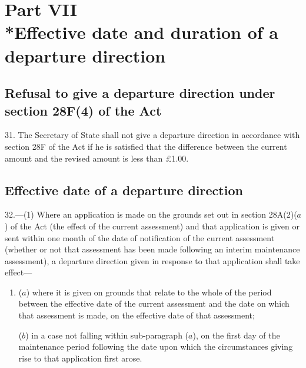\documentclass[12pt,a4paper]{article}
\begin{document}
\section[Part VII --- Effective date and duration of a departure direction]{Part VII\\*Effective date and duration of a departure direction}

\renewcommand\parthead{--- Part VII}

\subsection[31. Refusal to give a
departure direction under section 28F(4) of the Act]{Refusal to give a
departure direction under section 28F(4) of the Act}

31. The Secretary of State
shall not give a departure direction in accordance with section 28F of the Act
if he is satisfied that the difference between the current amount and the
revised amount is less than £1.00.

\subsection[32. Effective date of a departure direction]{Effective date of a departure direction}

32.—(1) Where an application is made on the grounds set out in section 28A(2)($a$) of the Act (the effect of the current assessment) and that application is given or sent within 
one month  %
of the date of notification of the current assessment (whether or not that assessment has been made following an interim maintenance assessment), a departure direction given in response to that application shall take effect—
\begin{enumerate}\item[]
($a$) where it is given on grounds that relate to the whole of the period between the effective date of the current assessment and the date on which that assessment is made, on the effective date of that assessment;

($b$) in a case not falling within sub-paragraph ($a$), on the first day of the maintenance period following the date upon which the circumstances giving rise to that application first arose.
\end{enumerate}
\end{document}
